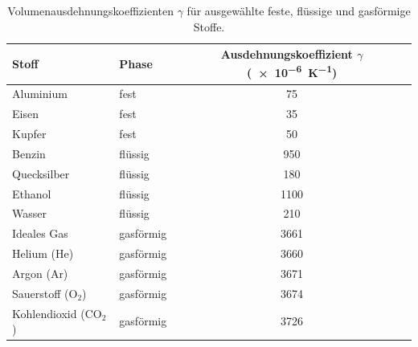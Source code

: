 \begin{table}[htb]
    \centering
    \caption{Volumenausdehnungskoeffizienten $\gamma$ für ausgewählte feste, flüssige und gasförmige Stoffe.}\label{tab: volumen_ausdehnungskoeffizienten}
    \vspace{4pt}
    \begin{tabular}{llc}
        \toprule
        \textbf{Stoff} & \textbf{Phase} & \textbf{Ausdehnungskoeffizient $\gamma$ (\SI{e-6}{\kelvin^{-1}})} \\
        \midrule
        Aluminium      & fest           & 75   \\
        Eisen          & fest           & 35   \\
        Kupfer         & fest           & 50   \\
        \midrule
        Benzin         & flüssig        & 950  \\
        Quecksilber    & flüssig        & 180  \\
        Ethanol        & flüssig        & 1100 \\
        Wasser         & flüssig        & 210  \\ %
        \midrule
        Ideales Gas    & gasförmig      & 3661 \\
        Helium (He)    & gasförmig      & 3660 \\
        Argon (Ar)     & gasförmig      & 3671 \\
        Sauerstoff ($\text{O}_2$) & gasförmig  & 3674 \\
        Kohlendioxid ($\text{CO}_2$) & gasförmig & 3726 \\
        \bottomrule
    \end{tabular}
\end{table}


